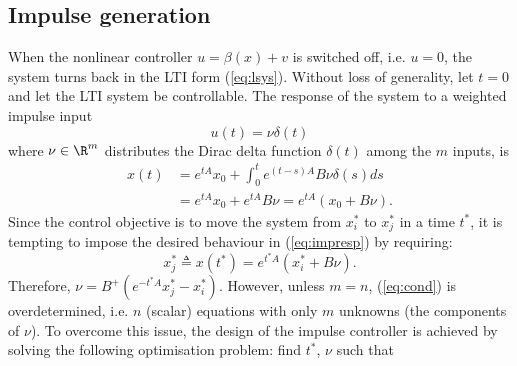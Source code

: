 \subsection{Impulse generation}
When the nonlinear controller $u=\beta(x)+v$ is switched off, i.e. $u=0$, the system turns back in the LTI form (\ref{eq:lsys}).
Without loss of generality, let $t = 0$ and let the LTI system be controllable. The response of the system to a weighted impulse input 
%
\begin{equation*}
u(t) = \nu\delta(t)
\end{equation*}
%
where $\nu\in\R^m$ distributes the Dirac delta function $\delta(t)$ among the $m$ inputs,
is
%
\begin{align}\label{eq:impresp}
    x(t) %
    &= e^{tA}x_0 + \int_0^te^{(t-s)A}B\nu\delta(s)ds \nonumber\\
    &=e^{tA}x_0 + e^{tA}B\nu = e^{tA}\left(x_0 + B\nu\right) .
\end{align}
%
Since the control objective is to move the system from $x_i^*$ to $x_j^*$ in a time $t^*$, it is tempting to impose the desired behaviour in (\ref{eq:impresp}) by requiring:
%
\begin{equation}\label{eq:cond}
    x_j^* \triangleq x(t^*) = e^{t^*A}\left(x_i^* + B\nu\right).
\end{equation}
%
Therefore,
    $\nu = B^{+}(e^{-t^*A}x_j^*-x_i^*).$
%
However, unless $m = n$, (\ref{eq:cond}) is overdetermined, i.e. $n$ (scalar) equations with only $m$ unknowns (the components of $\nu$). 
To overcome this issue, the design of the impulse controller is achieved by solving the following optimisation problem: 
find $t^*$, $\nu$ such that 
%
